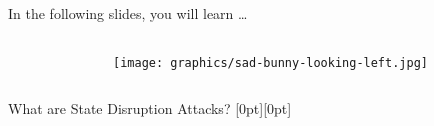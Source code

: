 \begin{frame}[light]{In the following slides, you will learn …}
\begin{columns}[fullwidth]
\begin{column}{.20\linewidth}
    \vspace{0.4cm}
  \end{column}
  \begin{column}{.20\linewidth}
    \vspace{1.6cm}
    \texttt{[image: graphics/sad-bunny-looking-left.jpg]}
  \end{column}
\end{columns}
\end{frame}


\begin{frame}{What are State Disruption Attacks?}
  \raisebox{0pt}[0pt][0pt]{
    \begin{minipage}{\textwidth}
      \vspace{2.2cm}
      \begin{columns}[T,fullwidth]
        \begin{column}{.325\linewidth}

\end{column}
\end{columns}
\end{minipage}}
\end{frame}
